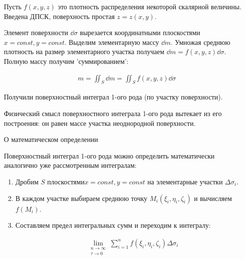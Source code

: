
\begin{twocolumns}
  
  \columnbreak

  Пусть \(f(x, y, z)\) это плотность распределения некоторой скалярной величины.
  Введена ДПСК, поверхность простая \(z = z(x, y)\).

  Элемент поверхности \(\dd \sigma\) вырезается координатными плоскостями
  \(x = const, y = const\). Выделим элементарную массу \(\dd  m\). Умножая
  среднюю плотность на размер элементарного участка получаем
  \(\dd m = f(x, y, z) \dd \sigma\). Полную массу получим 'суммированием':

  \begin{align*}
    m = \iint_{S} \dd m = \iint_{S} f(x, y, z) \dd \sigma
  \end{align*}

  Получили поверхностный интеграл 1-ого рода (по участку поверхности).
\end{twocolumns}

\begin{remark}
  Физический смысл поверхностного интеграла 1-ого рода вытекает из его
  построения: он равен массе участка неоднородной поверхности.
\end{remark}

\begin{remark}
  О математическом определении

  Поверхностный интеграл 1-ого рода можно определить математически аналогично
  уже рассмотренным интегралам:

  \begin{enumerate}
    \item Дробим \(S\) плоскостями\(x = const, y = const\) на элементарные
    участки \(\Delta \sigma_{i}\).

    \item В каждом участке выбираем среднюю точку
    \(M_{i}(\xi_{i}, \eta_{i}, \zeta_{i})\) и вычисляем \(f(M_{i})\).

    \item Составляем предел интегральных сумм и переходим к интегралу:

    \begin{align*}
      \lim_{\substack{n \to \infty \\ \tau \to 0}}
        \sum_{i = 1}^{n} f(\xi_{i}, \eta_{i}, \zeta_{i}) \Delta \sigma_{i}
    \end{align*}
  \end{enumerate}
\end{remark}

